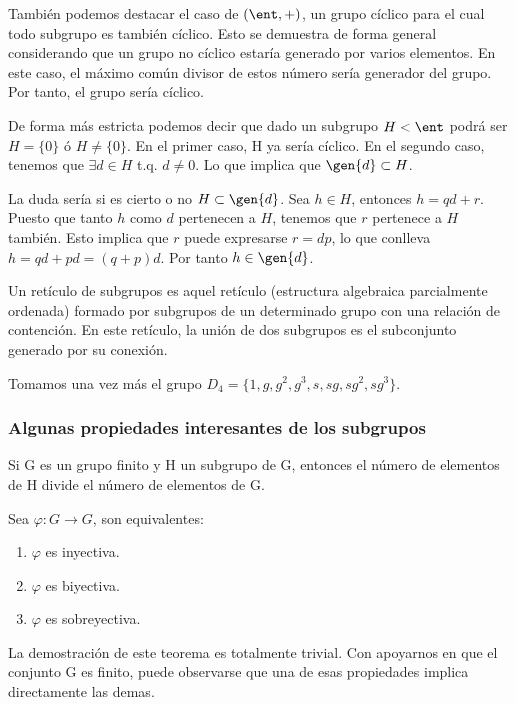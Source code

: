 \documentclass[nochap]{apuntes}
\begin{document}
   También podemos destacar el caso de $(\ent, +)$, un grupo cíclico para el cual todo subgrupo es también cíclico. Esto se demuestra
   de forma general considerando que un grupo no cíclico estaría generado por varios elementos. En este caso, el máximo común
   divisor de estos número sería generador del grupo. Por tanto, el grupo sería cíclico.

   De forma más estricta podemos decir que dado un subgrupo $H<\ent$ podrá ser $H=\{0\}$ ó $H\neq\{0\}$.
   En el primer caso, H ya sería cíclico. En el segundo caso, tenemos que $\exists  d \in  H$ t.q. $d\neq 0$. Lo que implica
   que $\gen{d} \subset H$.

   La duda sería si es cierto o no $H\subset \gen{d}$. Sea $h \in H$, entonces $h=qd+r$. Puesto que tanto $h$ como $d$ pertenecen a $H$,
   tenemos que $r$ pertenece a $H$ también. Esto implica que $r$ puede expresarse $r=dp$, lo que conlleva $h=qd+pd=(q+p)d$. Por tanto $h \in \gen{d}$.

  \begin{defn}
   Un retículo de subgrupos es aquel retículo (estructura algebraica parcialmente ordenada) formado por subgrupos de un determinado grupo
   con una relación de contención. En este retículo, la unión de dos subgrupos es el subconjunto generado por su conexión.
  \end{defn}

  \begin{example}
   Tomamos una vez más el grupo $D_{4}=\{1,g,g^{2}, g^{3}, s, sg, sg^{2}, sg^{3}\}$.\\


  \end{example}

\subsubsection{Algunas propiedades interesantes de los subgrupos}
 \begin{theorem}
   Si G es un grupo finito y H un subgrupo de G, entonces el número de elementos de H divide el número de elementos de G.
  \end{theorem}

  \begin{lemma}
   Sea $\varphi: G\rightarrow G$, son equivalentes:
   \begin{enumerate}
    \item $\varphi$  es inyectiva.
    \item $\varphi$  es biyectiva.
    \item $\varphi$  es sobreyectiva.
   \end{enumerate}
  \end{lemma}
  La demostración de este teorema es totalmente trivial. Con apoyarnos en que el conjunto G es finito, puede observarse que una de
  esas propiedades implica directamente las demas.
\end{document}
